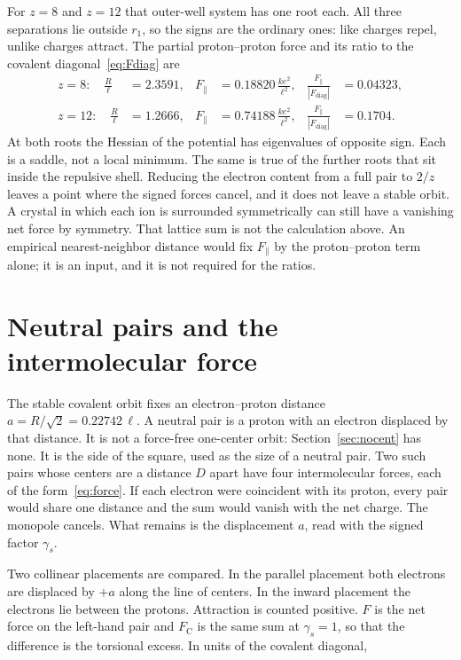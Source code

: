 \documentclass[a4paper]{article}
\begin{document}
For \(z=8\) and \(z=12\) that outer-well system has one root each. All three separations lie outside \(r_1\), so the signs are the ordinary ones: like charges repel, unlike charges attract. The partial proton--proton force and its ratio to the covalent diagonal~\eqref{eq:Fdiag} are
\begin{align}
z=8:\quad
\frac{R}{\ell}&=2.3591,&
F_{\parallel}&=0.18820\,\frac{k e^{2}}{\ell^{2}},&
\frac{F_{\parallel}}{|F_{\mathrm{diag}}|}&=0.04323,
\label{eq:ratio8}\\
z=12:\quad
\frac{R}{\ell}&=1.2666,&
F_{\parallel}&=0.74188\,\frac{k e^{2}}{\ell^{2}},&
\frac{F_{\parallel}}{|F_{\mathrm{diag}}|}&=0.1704.
\label{eq:ratio12}
\end{align}
At both roots the Hessian of the potential has eigenvalues of opposite sign. Each is a saddle, not a local minimum. The same is true of the further roots that sit inside the repulsive shell. Reducing the electron content from a full pair to \(2/z\) leaves a point where the signed forces cancel, and it does not leave a stable orbit. A crystal in which each ion is surrounded symmetrically can still have a vanishing net force by symmetry. That lattice sum is not the calculation above. An empirical nearest-neighbor distance would fix \(F_{\parallel}\) by the proton--proton term alone; it is an input, and it is not required for the ratios.

\section{Neutral pairs and the intermolecular force}
\label{sec:inter}

The stable covalent orbit fixes an electron--proton distance \(a=R/\sqrt{2}=0.22742\,\ell\). A neutral pair is a proton with an electron displaced by that distance. It is not a force-free one-center orbit: Section~\ref{sec:nocent} has none. It is the side of the square, used as the size of a neutral pair. Two such pairs whose centers are a distance \(D\) apart have four intermolecular forces, each of the form~\eqref{eq:force}. If each electron were coincident with its proton, every pair would share one distance and the sum would vanish with the net charge. The monopole cancels. What remains is the displacement \(a\), read with the signed factor \(\gamma_s\).

Two collinear placements are compared. In the parallel placement both electrons are displaced by \(+a\) along the line of centers. In the inward placement the electrons lie between the protons. Attraction is counted positive. \(F\) is the net force on the left-hand pair and \(F_{\mathrm{C}}\) is the same sum at \(\gamma_s=1\), so that the difference is the torsional excess. In units of the covalent diagonal,
\end{document}
